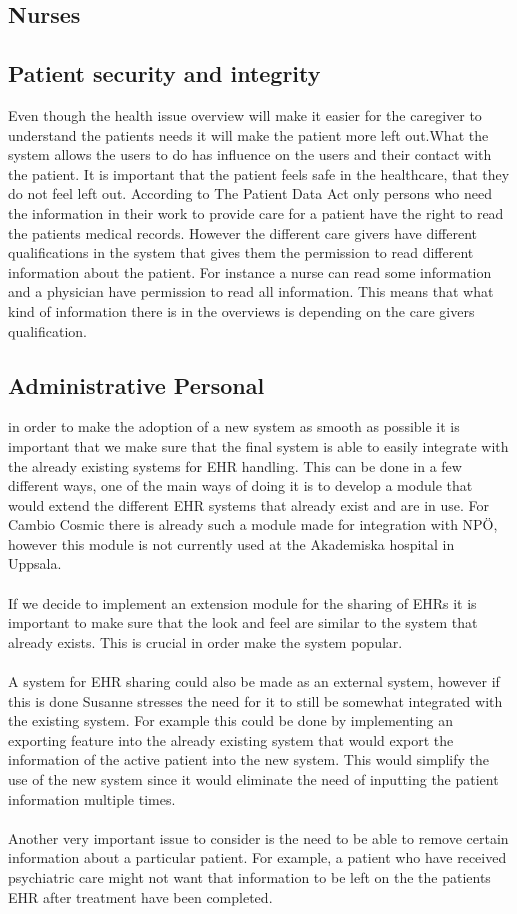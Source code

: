 \documentclass[14pt]{article}
\begin{document}
\subsection{Nurses}
\subsection{Patient security and integrity}
Even though the health issue overview will make it easier for the caregiver to understand the patients needs it will make the patient more left out.What the system allows the users to do has influence on the users and their contact with the patient. It is important that the patient feels safe in the healthcare, that they do not feel left out. According to The Patient Data Act only persons who need the information in their work to provide care for a patient have the right to read the patients medical records. However the different care givers have different qualifications in the system that gives them the permission to read different information about the patient. For instance a nurse can read some information and a physician have permission to read all information. This means that what kind of information there is in the overviews is depending on the care givers qualification.

\subsection{Administrative Personal}
in order to make the adoption of a new system as smooth as possible it is important that we make sure that the final system is able to easily integrate with the already existing systems for \gls{EHR} handling. This can be done in a few different ways, one of the main ways of doing it is to develop a module that would extend the different \gls{EHR} systems that already exist and are in use.\cite{EPJ2} For Cambio Cosmic there is already such a module made for integration with NPÖ, however this module is not currently used at the Akademiska hospital in Uppsala\cite{EPJ1}.
\\\\
If we decide to implement an extension module for the sharing of \glspl{EHR} it is important to make sure that the look and feel are similar to the system that already exists. This is crucial in order make the system popular. 
\\\\
A system for \gls{EHR} sharing could also be made as an external system, however if this is done Susanne stresses the need for it to still be somewhat integrated with the existing system. For example this could be done by implementing an exporting feature into the already existing system that would export the information of the active patient into the new system. This would simplify the use of the new system since it would eliminate the need of inputting the patient information multiple times.
\\\\
Another very important issue to consider is the need to be able to remove certain information about a particular patient. For example, a patient who have received psychiatric care might not want that information to be left on the the patients \gls{EHR} after treatment have been completed\cite{EPJ1}.
\end{document}
